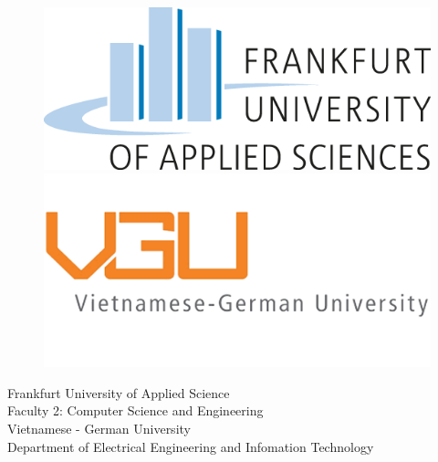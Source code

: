 \pagestyle{empty}

\begin{titlepage}
		\begin{figure}
			\begin{minipage}[c]{0.4\linewidth}
			\includegraphics[scale=0.20]{FRAUAS}
			\end{minipage}
			\hfil
				\begin{minipage}[c]{0.2\linewidth}
				\includegraphics[scale=0.3]{VGU}
			\end{minipage}	
		\end{figure}
        \begin{center}
        \normalsize
        	Frankfurt University of Applied Science\\
        	Faculty 2: Computer Science and Engineering\\
        	\vspace*{0.1cm}
        	Vietnamese - German University\\
        	Department of Electrical Engineering and Infomation Technology
        

\end{center}
\end{titlepage}
